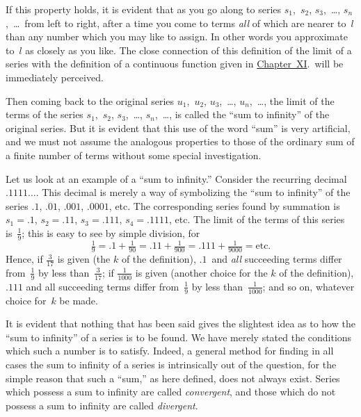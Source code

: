 \documentclass[12pt,leqno]{book}[2005/09/16]
\newcommand{\Chg}[2]{#2}
\newcommand{\ChapRef}[2][Chapter]{\hyperref[chapter:#2]{\Chg{#1}{Chapter}~#2}}
\newcommand{\PageSep}[1]{\ignorespaces}
\begin{document}
If this property holds, it is evident that as
you go along to series $s_{1}$,~$s_{2}$, $s_{3}$,~\dots, $s_{n}$,~\dots\
from left to right, after a time you come to
terms \emph{all} of which are nearer to~$l$ than any
number which you may like to assign. In
other words you approximate to~$l$ as closely
as you like. The close connection of this
definition of the limit of a series with the
definition of a continuous function given in
\ChapRef[chapter]{XI}.\ will be immediately perceived.

Then coming back to the original series $u_{1}$,~$u_{2}$,
$u_{3}$,~\dots, $u_{n}$,~\dots, the limit of the terms of
the series $s_{1}$,~$s_{2}$, $s_{3}$,~\dots, $s_{n}$,~\dots, is called
the ``sum to infinity'' of the original series.
But it is evident that this use of the word
\PageSep{202}
``sum'' is very artificial, and we must not
assume the analogous properties to those of
the ordinary sum of a finite number of terms
without some special investigation.

Let us look at an example of a ``sum to
infinity.'' Consider the recurring decimal
$.1111\dots$. This decimal is merely a way of
symbolizing the ``sum to infinity'' of the series
$.1$, $.01$, $.001$, $.0001$, etc. The corresponding
series found by summation is $s_{1} = .1$,
$s_{2} = .11$, $s_{3} = .111$, $s_{4} = .1111$, etc. The limit
of the terms of this series is~$\frac{1}{9}$; this is easy to
see by simple division, for
\[
\tfrac{1}{9}
  = .1 + \tfrac{1}{90}
  = .11 + \tfrac{1}{900}
  = .111 + \tfrac{1}{9000} = \text{etc.}
\]
Hence, if $\frac{3}{17}$ is given (the $k$ of the definition),
$.1$~and \emph{all} succeeding terms differ from~$\frac{1}{9}$ by
less than~$\frac{3}{17}$; if $\frac{1}{1000}$ is given (another choice
for the $k$ of the definition), $.111$ and all
succeeding terms differ from~$\frac{1}{9}$ by less than~$\frac{1}{1000}$;
and so on, whatever choice for~$k$ be
made.

It is evident that nothing that has been
said gives the slightest idea as to how the
``sum to infinity'' of a series is to be
found. We have merely stated the conditions
which such a number is to satisfy. Indeed,
a general method for finding in all
cases the sum to infinity of a series is intrinsically
out of the question, for the simple reason
that such a ``sum,'' as here defined, does not
always exist. Series which possess a sum to
\PageSep{203}
%
%
infinity are called \emph{convergent}, and those which
do not possess a sum to infinity are called
\emph{divergent}.
\end{document}
